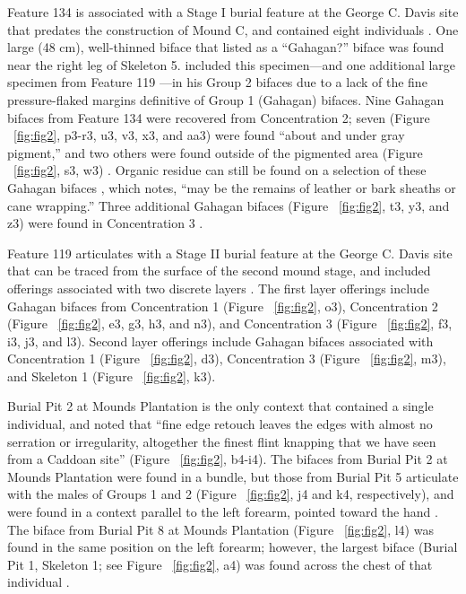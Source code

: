 \documentclass[review]{elsarticle}
\begin{document}
Feature 134 is associated with a Stage I burial feature at the George C. Davis site that predates the construction of Mound C, and contained eight individuals \citep{RN808,RN5050}. One large (48 cm), well-thinned biface that \citet[22]{RN808} listed as a “Gahagan?” biface was found near the right leg of Skeleton 5.  \citet[Figure 19x]{RN3684} included this specimen---and one additional large specimen from Feature 119 \citep[Figure 19w]{RN3684}---in his Group 2 bifaces due to a lack of the fine pressure-flaked margins definitive of Group 1 (Gahagan) bifaces. Nine Gahagan bifaces from Feature 134 were recovered from Concentration 2; seven (Figure ~\ref{fig:fig2}, p3-r3, u3, v3, x3, and aa3) were found “about and under gray pigment,” and two others were found outside of the pigmented area (Figure ~\ref{fig:fig2}, s3, w3) \citep[21-23 and Figure 12]{RN808}. Organic residue can still be found on a selection of these Gahagan bifaces \citep[Figure 2]{RN11783}, which \citet[228]{RN3684} notes, “may be the remains of leather or bark sheaths or cane wrapping.” Three additional Gahagan bifaces (Figure ~\ref{fig:fig2}, t3, y3, and z3) were found in Concentration 3 \citep[21-22 and Figure 12]{RN808}.

Feature 119 \citep[Figure 13-18]{RN808} articulates with a Stage II burial feature at the George C. Davis site that can be traced from the surface of the second mound stage, and included offerings associated with two discrete layers \citep{RN808,RN5050,RN806}. The first layer offerings include Gahagan bifaces from Concentration 1 (Figure ~\ref{fig:fig2}, o3), Concentration 2 (Figure ~\ref{fig:fig2}, e3, g3, h3, and n3), and Concentration 3 (Figure ~\ref{fig:fig2}, f3, i3, j3, and l3). Second layer offerings include Gahagan bifaces associated with Concentration 1 (Figure ~\ref{fig:fig2}, d3), Concentration 3 (Figure ~\ref{fig:fig2}, m3), and Skeleton 1 (Figure ~\ref{fig:fig2}, k3). 

Burial Pit 2 at Mounds Plantation is the only context that contained a single individual, and \citet[97]{RN11561} noted that “fine edge retouch leaves the edges with almost no serration or irregularity, altogether the finest flint knapping that we have seen from a Caddoan site” (Figure ~\ref{fig:fig2}, b4-i4). The bifaces from Burial Pit 2 at Mounds Plantation were found in a bundle, but those from Burial Pit 5 articulate with the males of Groups 1 and 2 (Figure ~\ref{fig:fig2}, j4 and k4, respectively), and were found in a context parallel to the left forearm, pointed toward the hand \citep[Figure 5]{RN11561}. The biface from Burial Pit 8 at Mounds Plantation (Figure ~\ref{fig:fig2}, l4) was found in the same position on the left forearm; however, the largest biface (Burial Pit 1, Skeleton 1; see Figure ~\ref{fig:fig2}, a4) was found across the chest of that individual \citep{RN11561}.
\end{document}
